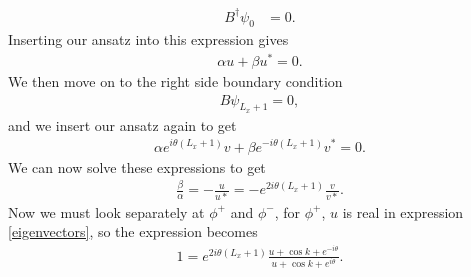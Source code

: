 \begin{align}
    B^\dag \psi_{0} &= 0.
\end{align}
Inserting our ansatz into this expression gives
\begin{align}
    \alpha u + \beta u^* = 0.
\end{align}
We then move on to the right side boundary condition
\begin{align}
    B \psi_{L_x + 1 } = 0,
\end{align}
and we insert our ansatz again to get
\begin{align}
    \alpha e^{i\theta (L_x + 1 )} v + \beta e^{-i\theta (L_x + 1 )} v^* = 0.
\end{align}
We can now solve these expressions to get
\begin{align}
    \frac{\beta}{\alpha} = - \frac{u}{u*} =  - e^{2i\theta (L_x + 1 )}\frac{v}{v*}.
\end{align}
Now we must look separately at $\phi^+$ and $\phi^-$, for $\phi^+$, $u$ is real in expression \ref{eigenvectors}, so the expression becomes
\begin{align}
    1 = e^{2i\theta (L_x + 1 )}\frac{u + \cos k + e^{-i\theta}}{u + \cos k + e^{i\theta}}.
\end{align}

